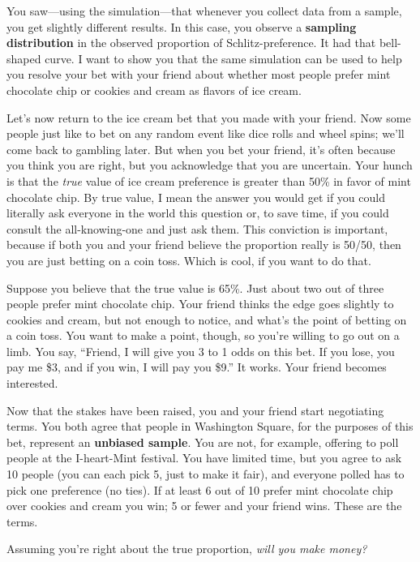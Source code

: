 \documentclass[
  openany]{book}
\begin{document}
You saw---using the simulation---that whenever you collect data from a sample, you get slightly different results. In this case, you observe a \textbf{sampling distribution} in the observed proportion of Schlitz-preference. It had that bell-shaped curve. I want to show you that the same simulation can be used to help you resolve your bet with your friend about whether most people prefer mint chocolate chip or cookies and cream as flavors of ice cream.

Let's now return to the ice cream bet that you made with your friend. Now some people just like to bet on any random event like dice rolls and wheel spins; we'll come back to gambling later. But when you bet your friend, it's often because you think you are right, but you acknowledge that you are uncertain. Your hunch is that the \emph{true} value of ice cream preference is greater than 50\% in favor of mint chocolate chip. By true value, I mean the answer you would get if you could literally ask everyone in the world this question or, to save time, if you could consult the all-knowing-one and just ask them. This conviction is important, because if both you and your friend believe the proportion really is 50/50, then you are just betting on a coin toss. Which is cool, if you want to do that.

Suppose you believe that the true value is 65\%. Just about two out of three people prefer mint chocolate chip. Your friend thinks the edge goes slightly to cookies and cream, but not enough to notice, and what's the point of betting on a coin toss. You want to make a point, though, so you're willing to go out on a limb. You say, ``Friend, I will give you 3 to 1 odds on this bet. If you lose, you pay me \$3, and if you win, I will pay you \$9.'' It works. Your friend becomes interested.

Now that the stakes have been raised, you and your friend start negotiating terms. You both agree that people in Washington Square, for the purposes of this bet, represent an \textbf{unbiased sample}. You are not, for example, offering to poll people at the I-heart-Mint festival. You have limited time, but you agree to ask 10 people (you can each pick 5, just to make it fair), and everyone polled has to pick one preference (no ties). If at least 6 out of 10 prefer mint chocolate chip over cookies and cream you win; 5 or fewer and your friend wins. These are the terms.

Assuming you're right about the true proportion, \emph{will you make money?}
\end{document}
